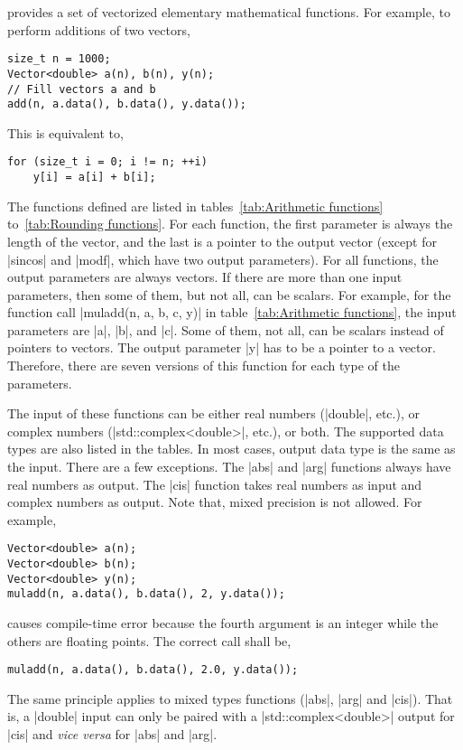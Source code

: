 \mckl provides a set of vectorized elementary mathematical functions. For
example, to perform additions of two vectors,
\begin{verbatim}
size_t n = 1000;
Vector<double> a(n), b(n), y(n);
// Fill vectors a and b
add(n, a.data(), b.data(), y.data());
\end{verbatim}
This is equivalent to,
\begin{verbatim}
for (size_t i = 0; i != n; ++i)
    y[i] = a[i] + b[i];
\end{verbatim}
The functions defined are listed in tables~\ref{tab:Arithmetic functions}
to~\ref{tab:Rounding functions}. For each function, the first parameter is
always the length of the vector, and the last is a pointer to the output vector
(except for |sincos| and |modf|, which have two output parameters). For all
functions, the output parameters are always vectors. If there are more than one
input parameters, then some of them, but not all, can be scalars. For example,
for the function call |muladd(n, a, b, c, y)| in table~\ref{tab:Arithmetic
functions}, the input parameters are |a|, |b|, and |c|. Some of them, not all,
can be scalars instead of pointers to vectors. The output parameter |y| has to
be a pointer to a vector. Therefore, there are seven versions of this function
for each type of the parameters.

The input of these functions  can be either real numbers (|double|, etc.), or
complex numbers (|std::complex<double>|, etc.), or both. The supported data
types are also listed in the tables. In most cases, output data type is the
same as the input. There are a few exceptions. The |abs| and |arg| functions
always have real numbers as output. The |cis| function takes real numbers as
input and complex numbers as output. Note that, mixed precision is not allowed.
For example,
\begin{verbatim}
Vector<double> a(n);
Vector<double> b(n);
Vector<double> y(n);
muladd(n, a.data(), b.data(), 2, y.data());
\end{verbatim}
causes compile-time error because the fourth argument is an integer while the
others are floating points. The correct call shall be,
\begin{verbatim}
muladd(n, a.data(), b.data(), 2.0, y.data());
\end{verbatim}
The same principle applies to mixed types functions (|abs|, |arg| and |cis|).
That is, a |double| input can only be paired with a |std::complex<double>|
output for |cis| and \emph{vice versa} for |abs| and |arg|.

